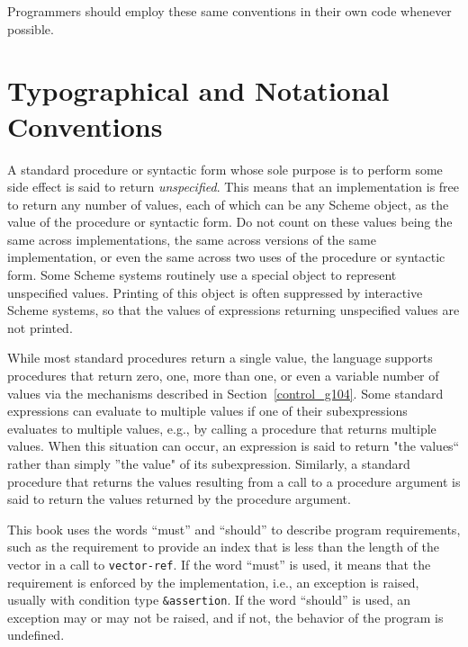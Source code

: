 Programmers should employ these same conventions in their own code whenever
possible.



\section{\label{intro_g3}\label{intro_h3}Typographical and Notational Conventions\label{intro_SECTINTRONOTATION}}



A standard procedure or syntactic form whose sole purpose is to perform
some side effect is said to return \label{intro_s53}\textit{unspecified}.
This means that an implementation is free to return any number of
values, each of which can be any Scheme object,
as the value of the procedure or syntactic form.
Do not count on these values being the same across implementations, the
same across versions of the same implementation, or even the same across
two uses of the procedure or syntactic form.
Some Scheme systems routinely use a special object to represent
unspecified values.
Printing of this object is often suppressed by interactive Scheme
systems, so that the values of expressions returning unspecified values 
are not printed.


\label{intro_s54}While most standard procedures return a single value, the language
supports procedures that return zero, one, more than one, or even a
variable number of values via the mechanisms described in
Section \ref{control_g104}.
Some standard expressions can evaluate to multiple values if one of their
subexpressions evaluates to multiple values, e.g., by calling a procedure
that returns multiple values.
When this situation can occur, an expression is said to return "the
values`` rather than simply ''the value" of its subexpression.
Similarly, a standard procedure that returns the values resulting from a
call to a procedure argument is said to return the values returned by the
procedure argument.


\label{intro_s55}This book uses the words ``must'' and ``should'' to
describe program requirements, such as the requirement to provide an index
that is less than the length of the vector in a call to
\texttt{vector-ref}.
If the word ``must'' is used, it means that the requirement is enforced
by the implementation, i.e., an exception is raised, usually with
condition type \texttt{\&{}assertion}.
If the word ``should'' is used, an exception may or may not be raised,
and if not, the behavior of the program is undefined.


